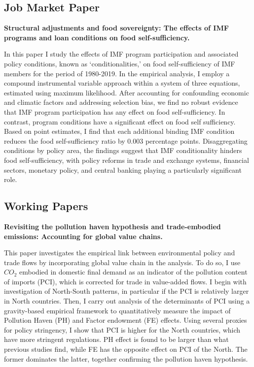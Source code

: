 
\subsection{Job Market Paper}

\textbf{Structural adjustments and food sovereignty: The effects of IMF
programs and loan conditions on food self-sufficiency.}
\vspace{1em}

 \parbox{\textwidth}{In this paper I study the effects of IMF program participation and associated policy conditions, known as ‘conditionalities,’ on food self-sufficiency of IMF members for the period of 1980-2019. In the empirical analysis, I employ a compound instrumental variable approach within a system of three equations, estimated using maximum likelihood. After accounting for confounding economic and climatic factors and addressing selection bias, we find no robust evidence that IMF program participation has any effect on food self-sufficiency. In contrast, program conditions have a significant effect on food self sufficiency. Based on point estimates, I find that each additional binding IMF condition reduces the food self-sufficiency ratio by 0.003 percentage points. Disaggregating conditions by policy area, the findings suggest that IMF conditionality hinders food self-sufficiency, with policy reforms in trade and exchange systems, financial sectors, monetary policy, and central banking playing a particularly significant role.}

\subsection{Working Papers}

\textbf{Revisiting the pollution haven hypothesis and trade-embodied emissions: Accounting for global value chains.}
\vspace{1em}

 \parbox{\textwidth}{This paper investigates the empirical link between environmental policy and trade flows by incorporating global value chain in the analysis. To do so, I use $CO_{2}$ embodied in domestic final demand as an indicator of the pollution content of imports (PCI), which is corrected for trade in value-added flows. I begin with investigation of North-South patterns, in particular if the PCI is relatively larger in North countries. Then, I carry out analysis of the determinants of PCI using a gravity-based empirical framework to quantitatively measure the impact of Pollution Haven (PH) and Factor endowment (FE) effects. Using several proxies for policy stringency, I show that PCI is higher for the North countries, which have more stringent regulations.  PH effect is found to be larger than what previous studies find, while FE has the opposite effect on PCI of the North. The former dominates the latter, together confirming the pollution haven hypothesis.}

